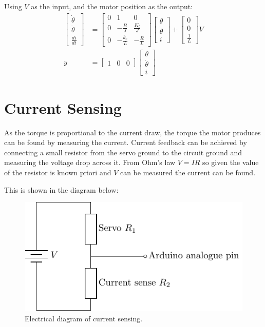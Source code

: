 \documentclass[11pt]{article}
\begin{document}
Using $V$ as the input, and the motor position as the output:
\begin{subequations}
  \begin{align}
    \begin{bmatrix}
      \dot{\theta} \\
      \ddot{\theta} \\
      \frac{di}{dt}
    \end{bmatrix}
    &=
    \begin{bmatrix}
      0 & 1 & 0 \\
      0 & -\frac{B}{J} & \frac{K_t}{J} \\
      0 & -\frac{k_e}{L} & -\frac{R}{L}
    \end{bmatrix}
    \begin{bmatrix}
      \theta \\
      \dot{\theta} \\
      i
    \end{bmatrix}
    +
    \begin{bmatrix}
      0 \\
      0 \\
      \frac{1}{L}
    \end{bmatrix}
    V \\
    y &=
    \begin{bmatrix}
      1 & 0 & 0
    \end{bmatrix}
    \begin{bmatrix}
      \theta \\
      \dot{\theta} \\
      i
    \end{bmatrix}
  \end{align}
\end{subequations}

\section{Current Sensing}
As the torque is proportional to the current draw, the torque the motor produces can be found by measuring the current.
Current feedback can be achieved by connecting a small resistor from the servo ground to the circuit ground and measuring the voltage drop across it.
From Ohm's law $V=IR$ so given the value of the resistor is known priori and $V$ can be measured the current can be found.

This is shown in the diagram below:
\begin{figure}[h]
  \centering
  \includegraphics{current_measure_schematic/current_measure_schematic.pdf}
  \caption{Electrical diagram of current sensing.}
\end{figure}
\end{document}
